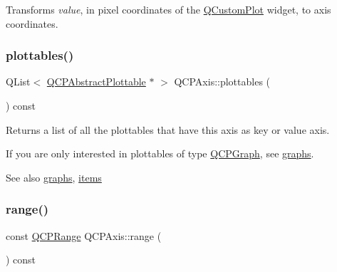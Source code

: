 Transforms {\itshape value}, in pixel coordinates of the \hyperlink{class_q_custom_plot}{Q\+Custom\+Plot} widget, to axis coordinates. \mbox{\label{class_q_c_p_axis_ac5e0f6f65c75efb5fd32275d6e4ef0d6}} 
\subsubsection{\texorpdfstring{plottables()}{plottables()}}
{\footnotesize\ttfamily Q\+List$<$ \hyperlink{class_q_c_p_abstract_plottable}{Q\+C\+P\+Abstract\+Plottable} $\ast$ $>$ Q\+C\+P\+Axis\+::plottables (\begin{DoxyParamCaption}{ }\end{DoxyParamCaption}) const}

Returns a list of all the plottables that have this axis as key or value axis.

If you are only interested in plottables of type \hyperlink{class_q_c_p_graph}{Q\+C\+P\+Graph}, see \hyperlink{class_q_c_p_axis_ad590c0da223697a2727f97a520870fec}{graphs}.

\begin{DoxySeeAlso}{See also}
\hyperlink{class_q_c_p_axis_ad590c0da223697a2727f97a520870fec}{graphs}, \hyperlink{class_q_c_p_axis_a42761bc68e2f3a9f68549d45b73f705b}{items} 
\end{DoxySeeAlso}
\mbox{\label{class_q_c_p_axis_ac4058855a81f1a883cf2e754f6a6acb1}} 
\subsubsection{\texorpdfstring{range()}{range()}}
{\footnotesize\ttfamily const \hyperlink{class_q_c_p_range}{Q\+C\+P\+Range} Q\+C\+P\+Axis\+::range (\begin{DoxyParamCaption}{ }\end{DoxyParamCaption}) const\hspace{0.3cm}{\ttfamily [inline]}}

\mbox{\label{class_q_c_p_axis_a0894084e4c16a1736534c4095746f910}} 
